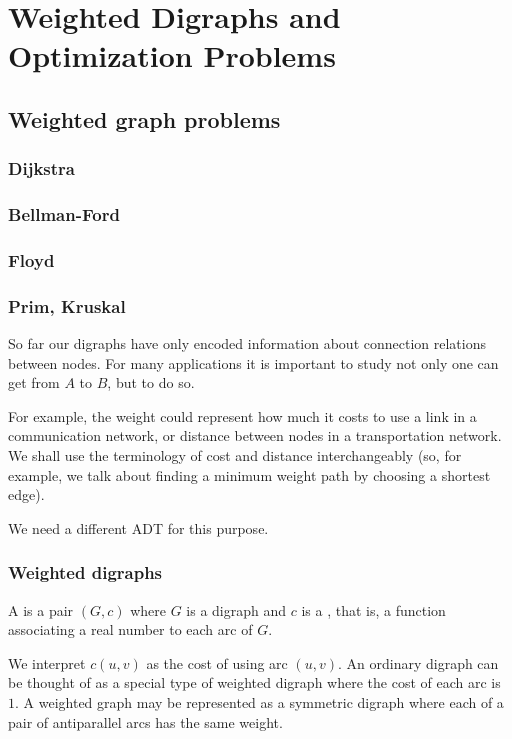 \part{Weighted Digraphs and Optimization Problems}
\label{ch:weighted}


\chapter{Weighted graph problems}
\section{Dijkstra}
\section{Bellman-Ford}
\section{Floyd}
\section{Prim, Kruskal}


So far our digraphs have only encoded information about connection
relations between nodes. For many applications it is important to study
not only  one can get from $A$ to $B$, but
 to do so.

For example, the weight could represent how much it costs to use a link
in a communication network, or distance between nodes in a
transportation network. We shall use the terminology of cost and distance
interchangeably (so, for example, we talk about finding a minimum weight
path by choosing a shortest edge).

We need a different ADT for this purpose. 

\section{Weighted digraphs}
\label{sec:weighted}

\begin{Definition}
A  is a pair $(G, c)$ where $G$ is a digraph
and $c$ is a , that is, a function associating a
real number to each arc of $G$.
\end{Definition}

We interpret $c(u, v)$ as the cost of using arc $(u, v)$. An ordinary digraph 
can be thought of as a special type of weighted digraph where the cost of each 
arc is $1$. A weighted graph may be represented as a symmetric digraph where 
each of a pair of antiparallel arcs has the same weight.

